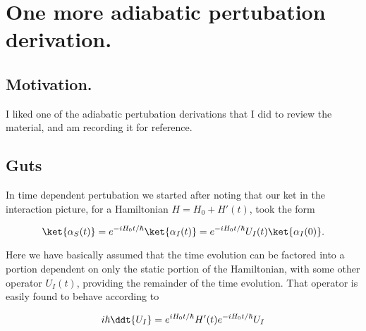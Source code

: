 
%

\chapter{One more adiabatic pertubation derivation.}
\label{chap:oneMoreAdiabatic}
{}
\date{Dec 8, 2011}

\beginArtWithToc

\section{Motivation.}

I liked one of the adiabatic pertubation derivations that I did to review the material, and am recording it for reference.

\section{Guts}

In time dependent pertubation we started after noting that our ket in the interaction picture, for a Hamiltonian $H = H_0 + H'(t)$, took the form

\begin{equation}\label{eqn:oneMoreAdiabatic:10}
\ket{\alpha_S(t)} 
= e^{-i H_0 t/\hbar} \ket{\alpha_I(t)} = e^{-i H_0 t/\hbar} U_I(t) \ket{\alpha_I(0)}.
\end{equation}

Here we have basically assumed that the time evolution can be factored into a portion dependent on only the static portion of the Hamiltonian, with some other operator $U_I(t)$, providing the remainder of the time evolution.  That operator is easily found to behave according to

\begin{equation}\label{eqn:oneMoreAdiabatic:30}
i \hbar \ddt{U_I} = e^{i H_0 t/\hbar} H'(t) e^{-i H_0 t/\hbar} U_I
\end{equation}



\EndArticle

